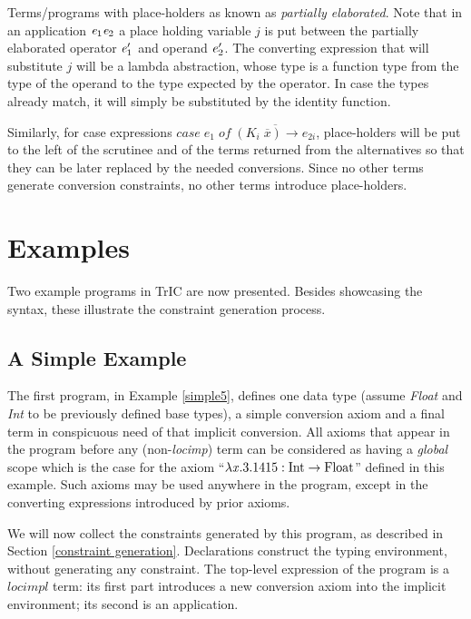 Terms/programs with place-holders as known as \textit{partially elaborated}. Note that in an application $\mathit{e}_1 \mathit{e}_2$ a place holding variable $j$ is put between the partially elaborated operator $\mathit{e}_1'$ and operand $\mathit{e}_2'$. The converting expression that will substitute $j$ will be a lambda abstraction, whose type is a function type from the type of the operand to the type expected by the operator. In case the types already match, it will simply be substituted by the identity function.

Similarly, for case expressions $case\;e_1\;of\;\overline{(K_i\;\overline{x})\rightarrow e_{2i}}$, place-holders will be put to the left of the scrutinee and of the terms returned from the alternatives so that they can be later replaced by the needed conversions. Since no other terms generate conversion constraints, no other terms introduce place-holders.


\section{Examples}
\label{eg5}
Two example programs in TrIC are now presented. Besides showcasing the syntax, these illustrate the constraint generation process.
\subsection{A Simple Example}


The first program, in Example \ref{simple5}, defines one data type (assume \textit{Float} and \textit{Int} to be previously defined base types), a simple conversion axiom and a final term in conspicuous need of that implicit conversion. All axioms that appear in the program before any (non-\textit{locimp}) term can be considered as having a \textit{global} scope which is the case for the axiom ``${\lambda \mathit{x}.3.1415}: \text{Int} \to \text{Float}$'' defined in this example. Such axioms may be used anywhere in the program, except in the converting expressions introduced by prior axioms.

We will now collect the constraints generated by this program, as described in Section \ref{constraint generation}. Declarations construct the typing environment, without generating any constraint. The top-level expression of the program is a $locimpl$ term: its first part introduces a new conversion axiom into the implicit environment; its second is an application.

